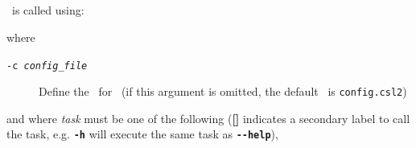 \vspace*{4mm}

\subsection{\label{sec:command-line-arguments}}

\CNAME~is called using:

\texttt{}

where

\begin{description}
  \item [\texttt{-c \emph{config\_file}}] Define the \config~for \CNAME~(if this argument is omitted, the default \config~is \texttt{config.csl2})
\end{description}

and where \emph{task} must be one of the following (\textbf{[]} indicates a secondary label to call the task, e.g. \textbf{\texttt{-h}} will execute the same task as \textbf{\texttt{-{}-help}}),


